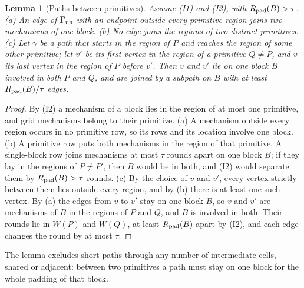 \documentclass[aps,prx,reprint,superscriptaddress,nofootinbib,floatfix,longbibliography]{revtex4-2}
\newtheorem{lemma}[theorem]{Lemma}
\theoremstyle{definition}
\begin{document}
\begin{lemma}[Paths between primitives]\label{lem:primitive-paths}
Assume (I1) and (I2), with $R_{\rm pad}(B)>\tau$.  (a) An edge of
$\Gamma_{\rm un}$ with an endpoint outside every primitive region joins two
mechanisms of one block.  (b) No edge joins the regions of two distinct
primitives.  (c) Let $\gamma$ be a path that starts in the region of $P$ and
reaches the region of some other primitive; let $v'$ be its first vertex in
the region of a primitive $Q\neq P$, and $v$ its last vertex in the region of
$P$ before $v'$.  Then $v$ and $v'$ lie on one block $B$ involved in both $P$
and $Q$, and are joined by a subpath on $B$ with at least
$R_{\rm pad}(B)/\tau$ edges.
\end{lemma}
\begin{proof}
By (I2) a mechanism of a block lies in the region of at most one primitive,
and grid mechanisms belong to their primitive.  (a) A mechanism outside every
region occurs in no primitive row, so its rows and its location involve one
block.  (b) A primitive row puts both mechanisms in the region of that
primitive.  A single-block row joins mechanisms at most $\tau$ rounds apart on
one block $B$; if they lay in the regions of $P\neq P'$, then $B$ would be in
both, and (I2) would separate them by $R_{\rm pad}(B)>\tau$ rounds.  (c) By
the choice of $v$ and $v'$, every vertex strictly between them lies outside
every region, and by (b) there is at least one such vertex.  By (a) the edges
from $v$ to $v'$
stay on one block $B$, so $v$ and $v'$ are mechanisms of $B$ in the regions
of $P$ and $Q$, and $B$ is involved in both.  Their rounds lie in $W(P)$ and
$W(Q)$, at least $R_{\rm pad}(B)$ apart by (I2), and each edge changes the
round by at most $\tau$.
\end{proof}

The lemma excludes short paths through any number of intermediate cells,
shared or adjacent: between two primitives a path must stay on one block for
the whole padding of that block.
\end{document}
